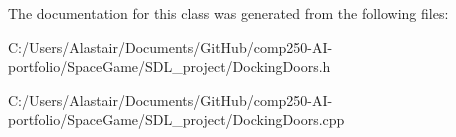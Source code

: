 The documentation for this class was generated from the following files\+:\begin{DoxyCompactItemize}
\item 
C\+:/\+Users/\+Alastair/\+Documents/\+Git\+Hub/comp250-\/\+A\+I-\/portfolio/\+Space\+Game/\+S\+D\+L\+\_\+project/Docking\+Doors.\+h\item 
C\+:/\+Users/\+Alastair/\+Documents/\+Git\+Hub/comp250-\/\+A\+I-\/portfolio/\+Space\+Game/\+S\+D\+L\+\_\+project/Docking\+Doors.\+cpp\end{DoxyCompactItemize}
